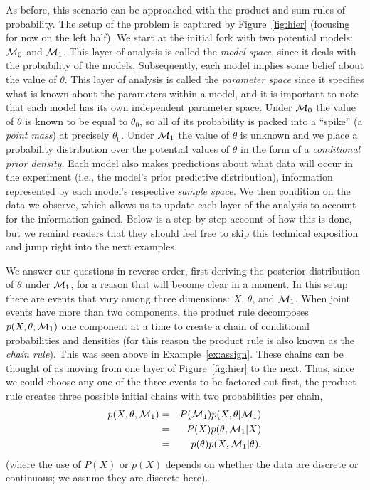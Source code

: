 As before, this scenario can be approached with the product and sum rules of probability. The setup of the problem is captured by Figure~\ref{fig:hier} (focusing for now on the left half). We start at the initial fork with two potential models: ${\cal M}_0$ and ${\cal M}_1$. This layer of analysis is called the \textit{model space}, since it deals with the probability of the models. Subsequently, each model implies some belief about the value of $\theta$. This layer of analysis is called the \textit{parameter space} since it specifies what is known about the parameters within a model, and {it is important to note that} each model has its own independent parameter space. Under ${\cal M}_0$ the value of $\theta$ is known to be equal to $\theta_0$, so all of its probability is packed into a ``spike'' (a \emph{point mass}) at precisely $\theta_0$. Under ${\cal M}_1$ the value of $\theta$ is unknown and we place a probability distribution over the potential values of $\theta$ in the form of a \emph{conditional prior density}. Each model also makes predictions about what data will occur in the experiment {(i.e., the model's prior predictive distribution)}, information represented by each model's respective \textit{sample space.} We then condition on the data we observe, which allows us to update each layer of the analysis to account for the information gained. Below is a step-by-step account of how this is done{, but we remind readers that they should feel free to skip this technical exposition and jump right into the next examples.}

We answer our questions in reverse order, first deriving the posterior distribution of $\theta$ under ${\cal M}_1$, for a reason that will become clear in a moment. In this setup there are events that vary among three dimensions: $X$, $\theta$, and ${\cal M}_1$. When joint events have more than two components, the product rule decomposes $p(X,\theta,{\cal M}_1)$ one component at a time to create a chain of conditional probabilities and densities (for this reason the product rule is also known as the \textit{chain rule}). This was seen above in Example~\ref{ex:assign}. These chains can be thought of as moving from one layer of Figure~\ref{fig:hier} to the next. Thus, since we could choose any one of the three events to be factored out first, the product rule creates three possible initial chains with two probabilities per chain,
\begin{eqnarray*}
  p(X,\theta,{\cal M}_1) & = & P({\cal M}_1)p(X,\theta|{\cal M}_1)   \\
                   & = & P(X)p(\theta,{\cal M}_1|X)      \\
                   & = & p(\theta)p(X,{\cal M}_1|\theta).
\end{eqnarray*}
(where the use of $P(X)$ or $p(X)$ depends on whether the data are discrete or continuous; we assume they are discrete here).


